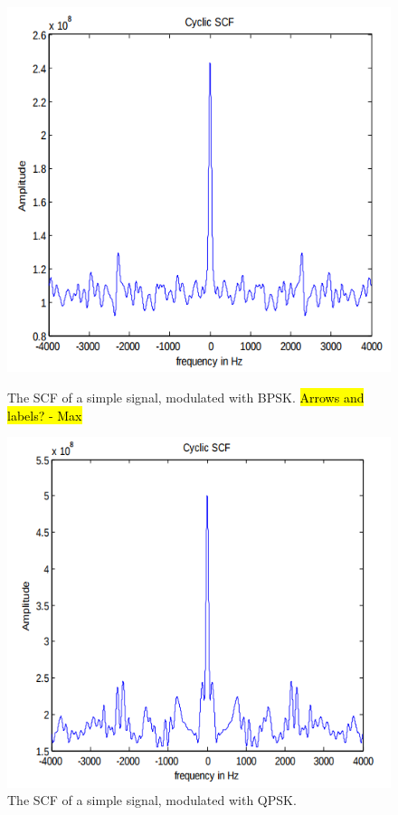 \begin{figure}[ht!]
\begin{minipage}{.4\textwidth}
  \centering
\includegraphics[scale=0.3]{img/cyclic_scf_bpsk.png}
\caption{The SCF of a simple signal, modulated with BPSK. \hl{Arrows and labels? - Max}}
\label{fig:cyclic_scf_bpsk}
\end{minipage}
\begin{minipage}{0.4\textwidth}
\centering
\includegraphics[scale=0.3]{img/cyclic_scf_qpsk.png}
\caption{The SCF of a simple signal, modulated with QPSK.}
\label{fig:cyclic_scf_qpsk}
\end{minipage}
\end{figure}

